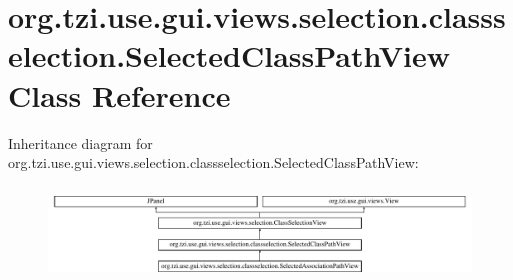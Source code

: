 \hypertarget{classorg_1_1tzi_1_1use_1_1gui_1_1views_1_1selection_1_1classselection_1_1_selected_class_path_view}{\section{org.\-tzi.\-use.\-gui.\-views.\-selection.\-classselection.\-Selected\-Class\-Path\-View Class Reference}
\label{classorg_1_1tzi_1_1use_1_1gui_1_1views_1_1selection_1_1classselection_1_1_selected_class_path_view}
}
Inheritance diagram for org.\-tzi.\-use.\-gui.\-views.\-selection.\-classselection.\-Selected\-Class\-Path\-View\-:\begin{figure}[H]
\begin{center}
\leavevmode
\includegraphics[height=2.522522cm]{classorg_1_1tzi_1_1use_1_1gui_1_1views_1_1selection_1_1classselection_1_1_selected_class_path_view}
\end{center}
\end{figure}
